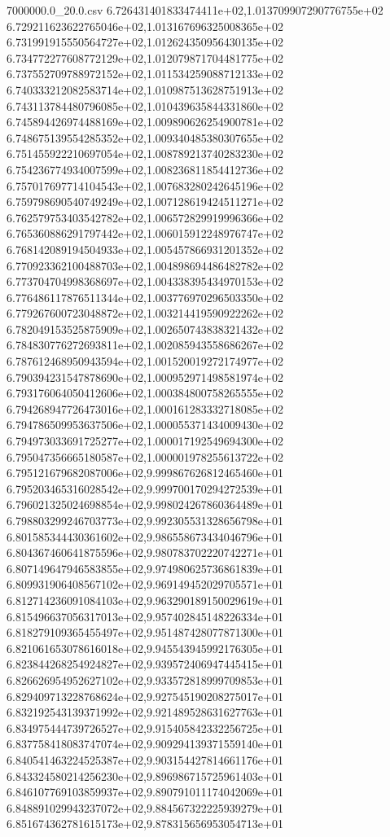 \begin{filecontents*}{7000000.0_20.0.csv}
6.726431401833474411e+02,1.013709907290776755e+02
6.729211623622765046e+02,1.013167696325008365e+02
6.731991915550564727e+02,1.012624350956430135e+02
6.734772277608772129e+02,1.012079871704481775e+02
6.737552709788972152e+02,1.011534259088712133e+02
6.740333212082583714e+02,1.010987513628751913e+02
6.743113784480796085e+02,1.010439635844331860e+02
6.745894426974488169e+02,1.009890626254900781e+02
6.748675139554285352e+02,1.009340485380307655e+02
6.751455922210697054e+02,1.008789213740283230e+02
6.754236774934007599e+02,1.008236811854412736e+02
6.757017697714104543e+02,1.007683280242645196e+02
6.759798690540749249e+02,1.007128619424511271e+02
6.762579753403542782e+02,1.006572829919996366e+02
6.765360886291797442e+02,1.006015912248976747e+02
6.768142089194504933e+02,1.005457866931201352e+02
6.770923362100488703e+02,1.004898694486482782e+02
6.773704704998368697e+02,1.004338395434970153e+02
6.776486117876511344e+02,1.003776970296503350e+02
6.779267600723048872e+02,1.003214419590922262e+02
6.782049153525875909e+02,1.002650743838321432e+02
6.784830776272693811e+02,1.002085943558686267e+02
6.787612468950943594e+02,1.001520019272174977e+02
6.790394231547878690e+02,1.000952971498581974e+02
6.793176064050412606e+02,1.000384800758265555e+02
6.794268947726473016e+02,1.000161283332718085e+02
6.794786509953637506e+02,1.000055371434009430e+02
6.794973033691725277e+02,1.000017192549694300e+02
6.795047356665180587e+02,1.000001978255613722e+02
6.795121679682087006e+02,9.999867626812465460e+01
6.795203465316028542e+02,9.999700170294272539e+01
6.796021325024698854e+02,9.998024267860364489e+01
6.798803299246703773e+02,9.992305531328656798e+01
6.801585344430361602e+02,9.986558673434046796e+01
6.804367460641875596e+02,9.980783702220742271e+01
6.807149647946583855e+02,9.974980625736861839e+01
6.809931906408567102e+02,9.969149452029705571e+01
6.812714236091084103e+02,9.963290189150029619e+01
6.815496637056317013e+02,9.957402845148226334e+01
6.818279109365455497e+02,9.951487428077871300e+01
6.821061653078616018e+02,9.945543945992176305e+01
6.823844268254924827e+02,9.939572406947445415e+01
6.826626954952627102e+02,9.933572818999709853e+01
6.829409713228768624e+02,9.927545190208275017e+01
6.832192543139371992e+02,9.921489528631627763e+01
6.834975444739726527e+02,9.915405842332256725e+01
6.837758418083747074e+02,9.909294139371559140e+01
6.840541463224525387e+02,9.903154427814661176e+01
6.843324580214256230e+02,9.896986715725961403e+01
6.846107769103859937e+02,9.890791011174042069e+01
6.848891029943237072e+02,9.884567322225939279e+01
6.851674362781615173e+02,9.878315656953054713e+01

\end{filecontents*}
